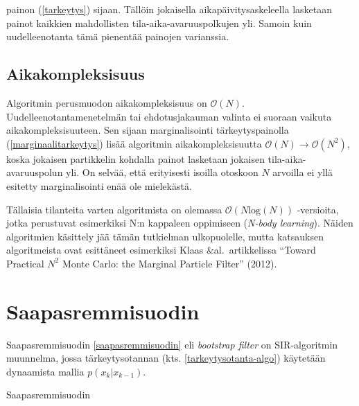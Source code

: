 \documentclass[
  12pt,
  a4paper, twoside]{book}
\begin{document}
\noindent painon (\ref{tarkeytys}) sijaan. Tällöin jokaisella aikapäivitysaskeleella lasketaan painot kaikkien mahdollisten tila-aika-avaruuspolkujen yli. Samoin kuin uudelleenotanta tämä pienentää painojen varianssia.

\subsection{Aikakompleksisuus}

Algoritmin perusmuodon aikakompleksisuus on \(\mathcal{O}(N)\). Uudelleenotantamenetelmän tai ehdotusjakauman valinta ei suoraan vaikuta aikakompleksisuuteen. Sen sijaan marginalisointi tärkeytyspainolla (\ref{marginaalitarkeytys}) lisää algoritmin aikakompleksisuutta \(\mathcal{O}(N)\rightarrow\mathcal{O}(N^2)\), koska jokaisen partikkelin kohdalla painot lasketaan jokaisen tila-aika-avaruuspolun yli. On selvää, että erityisesti isoilla otoskoon \(N\) arvoilla ei yllä esitetty marginalisointi enää ole mielekästä.

Tällaisia tilanteita varten algoritmista on olemassa \(\mathcal{O}(N\text{log}(N))\) -versioita, jotka perustuvat esimerkiksi N:n kappaleen oppimiseen (\emph{N-body learning}). Näiden algoritmien käsittely jää tämän tutkielman ulkopuolelle, mutta katsauksen algoritmeista ovat esittäneet esimerkiksi Klaas \&al.~artikkelissa ``Toward Practical \(N^2\) Monte Carlo: the Marginal Particle Filter'' (2012).

\section{Saapasremmisuodin}

Saapasremmisuodin \ref{saapasremmisuodin} eli \emph{bootstrap filter} on SIR-algoritmin muunnelma, jossa tärkeytysotannan (kts. \ref{tarkeytysotanta-algo}) käytetään dynaamista mallia \(p(x_k|x_{k-1})\).

\begin{algorithm}[H]
\label{saapasremmisuodin}
\DontPrintSemicolon
\SetAlgoShortEnd
{}
\caption{Saapasremmisuodin}
\end{algorithm}
\end{document}
